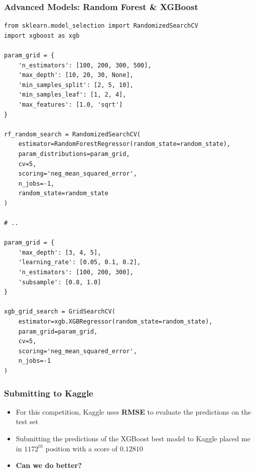 \documentclass{beamer}
\begin{document}
\begin{frame}[fragile]
\frametitle{Advanced Models: Random Forest \& XGBoost}

\begin{verbatim}
from sklearn.model_selection import RandomizedSearchCV
import xgboost as xgb

param_grid = {
    'n_estimators': [100, 200, 300, 500],
    'max_depth': [10, 20, 30, None],
    'min_samples_split': [2, 5, 10],
    'min_samples_leaf': [1, 2, 4],
    'max_features': [1.0, 'sqrt']
}

rf_random_search = RandomizedSearchCV(
    estimator=RandomForestRegressor(random_state=random_state),
    param_distributions=param_grid,
    cv=5,
    scoring='neg_mean_squared_error',
    n_jobs=-1,
    random_state=random_state
)

# ..

param_grid = {
    'max_depth': [3, 4, 5],
    'learning_rate': [0.05, 0.1, 0.2],
    'n_estimators': [100, 200, 300],
    'subsample': [0.8, 1.0]
}

xgb_grid_search = GridSearchCV(
    estimator=xgb.XGBRegressor(random_state=random_state),
    param_grid=param_grid,
    cv=5,
    scoring='neg_mean_squared_error',
    n_jobs=-1
)
\end{verbatim}
\end{frame}

\begin{frame}
\frametitle{Submitting to Kaggle}

\begin{itemize}
    \item For this competition, Kaggle uses \textbf{RMSE} to evaluate the predictions on the test set
    \item Submitting the predictions of the XGBoost best model to Kaggle placed me in \textbf{$1172^{th}$} position with a score of \textbf{$0.12810$}
    \item \textbf{Can we do better?}
\end{itemize}
\end{frame}
\end{document}
